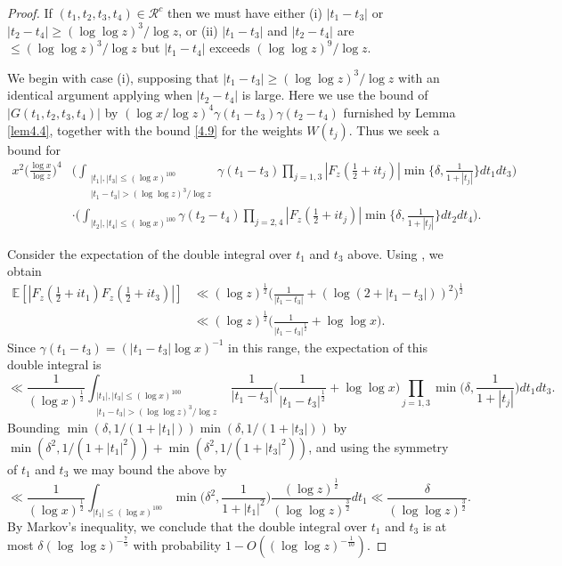 \documentclass[12pt, notitlepage]{amsart}
\numberwithin{equation}{section}
\def\E{\mathbb E}
\theoremstyle{remark}
\theoremstyle{definition}
\theoremstyle{remark}
\numberwithin{equation}{section}
\begin{document}
 \begin{proof}  If $(t_1,t_2,t_3,t_4) \in {\mathcal R}^c$ then we must have either (i) $|t_1-t_3|$ or $|t_2-t_4| \ge (\log \log z)^3/\log z$, or (ii) $|t_1-t_3|$ and $|t_2-t_4|$ are 
 $\le (\log \log z)^3/\log z$ but $|t_1-t_4|$ exceeds $(\log \log z)^9/\log z$.   
 
 We begin with case (i), supposing that $|t_1-t_3| \ge (\log \log z)^3/\log z$ with an identical argument applying when $|t_2-t_4|$ is large.  Here we use the bound of $|G(t_1,t_2,t_3,t_4)|$ by $(\log x/\log z)^4 \gamma(t_1-t_3) \gamma(t_2-t_4)$ furnished by Lemma \ref{lem4.4}, together with the bound \eqref{4.9} for the weights $W(t_j)$.   Thus we seek a bound for 
\begin{align} \label{4.17} 
x^2 \Big(\frac{\log x}{\log z}\Big)^4 &\Big( \int_{\substack{|t_1|, |t_3| \leq (\log x)^{100} \\ |t_1-t_3|>(\log \log z)^{3}/\log z}} \gamma(t_1 - t_3) \prod_{j=1,3} |F_z(\tfrac{1}{2}+it_j)| \min\Big\{
\delta, \frac{1}{1+|t_j|}\Big\} dt_1 dt_3 \Big) \nonumber \\
& \cdot \Big( \int_{|t_2|, |t_4| \leq (\log x)^{100}} \gamma(t_2 - t_4) \prod_{j=2,4} |F_z(\tfrac{1}{2}+it_j)| \min\Big\{\delta, \frac{1}{1+|t_j|}\Big\} dt_2 dt_4 \Big).
\end{align}
 
 Consider the expectation of the double integral over $t_1$ and $t_3$ above.  Using \cite[Euler product result 1]{Harperlargevalue}, we obtain 
 \begin{align*}
 \E[|F_z(\tfrac 12+it_1) F_z(\tfrac 12+it_3)|] &\ll (\log z)^{\frac 12} \Big( \frac{1}{|t_1-t_3|} + (\log (2+|t_1-t_3|))^2 \Big)^{\frac 12}\\
 & \ll (\log z)^{\frac 12} \Big( \frac{1}{|t_1-t_3|^{\frac 12}} + \log \log x\Big).  
 \end{align*} 
 Since $\gamma(t_1-t_3) = (|t_1-t_3| \log x)^{-1}$ in this range, the expectation of this double integral is 
 $$ 
 \ll \frac{1}{(\log x)^{\frac 12}} \int_{\substack{|t_1|, |t_3| \leq (\log x)^{100} \\ |t_1-t_3|>(\log \log z)^{3}/\log z}} \frac{1}{|t_1-t_3|} \Big(\frac{1}{|t_1-t_3|^{\frac 12}} + \log \log x\Big) 
 \prod_{j=1, 3} \min\Big( \delta, \frac{1}{1+|t_j|}\Big) dt_1 dt_3. 
 $$ 
Bounding $\min(\delta, 1/(1+|t_1|)) \min (\delta, 1/(1+|t_3|))$ by $\min(\delta^2, 1/(1+|t_1|^2)) + \min(\delta^2, 1/(1+|t_3|^2))$, and using the symmetry of $t_1$ and $t_3$ we may bound the above by 
$$ 
\ll  \frac{1}{(\log x)^{\frac 12}} \int_{|t_1| \le (\log x)^{100}} \min\Big(\delta^2, \frac{1}{1+|t_1|^2}\Big)  \frac{(\log z)^{\frac 12}}{(\log \log z)^{\frac 32}} dt_1 
\ll \frac{\delta}{(\log \log z)^{\frac 32}}. 
$$ 
By Markov's inequality, we conclude that the double integral over $t_1$ and $t_3$ is at most $\delta (\log \log z)^{-\frac 75}$ with probability $1-O((\log \log z)^{-\frac 1{10}})$.


\end{proof}
\end{document}
